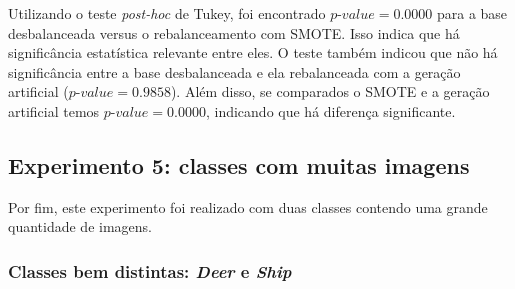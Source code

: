 
Utilizando o teste \textit{post-hoc} de Tukey, foi encontrado $\textit{p-value} = 0.0000$ para a base desbalanceada versus o rebalanceamento com SMOTE. Isso indica que há significância estatística relevante entre eles. O teste também indicou que não há significância entre a base desbalanceada e ela rebalanceada com a geração artificial ($\textit{p-value} = 0.9858$). Além disso, se comparados o SMOTE e a geração artificial temos $\textit{p-value} = 0.0000$, indicando que há diferença significante.



\FloatBarrier
\subsection{Experimento 5: classes com muitas imagens}

Por fim, este experimento foi realizado com duas classes contendo uma grande quantidade de imagens.

\subsubsection{Classes bem distintas: \textit{Deer} e \textit{Ship}}


